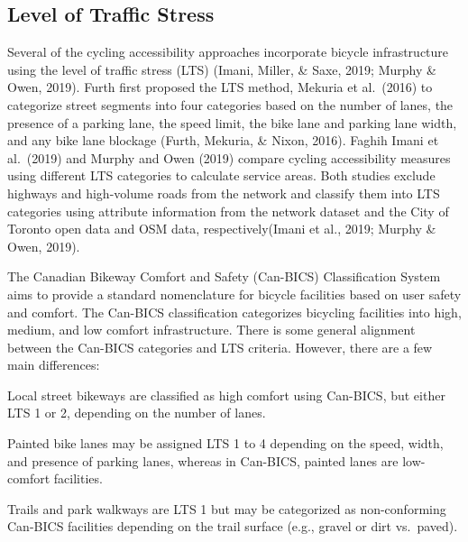 \documentclass[
11pt, %
oneside, %
english, %
singlespacing, %
]{macthesis} %
\begin{document}
\hypertarget{level-of-traffic-stress}{%
\subsection{Level of Traffic Stress}\label{level-of-traffic-stress}}

Several of the cycling accessibility approaches incorporate bicycle infrastructure using the level of traffic stress (LTS) (Imani, Miller, \& Saxe, 2019; Murphy \& Owen, 2019). Furth first proposed the LTS method, Mekuria et al.~(2016) to categorize street segments into four categories based on the number of lanes, the presence of a parking lane, the speed limit, the bike lane and parking lane width, and any bike lane blockage (Furth, Mekuria, \& Nixon, 2016). Faghih Imani et al.~(2019) and Murphy and Owen (2019) compare cycling accessibility measures using different LTS categories to calculate service areas. Both studies exclude highways and high-volume roads from the network and classify them into LTS categories using attribute information from the network dataset and the City of Toronto open data and OSM data, respectively(Imani et al., 2019; Murphy \& Owen, 2019).

The Canadian Bikeway Comfort and Safety (Can-BICS) Classification System aims to provide a standard nomenclature for bicycle facilities based on user safety and comfort. The Can-BICS classification categorizes bicycling facilities into high, medium, and low comfort infrastructure. There is some general alignment between the Can-BICS categories and LTS criteria. However, there are a few main differences:

Local street bikeways are classified as high comfort using Can-BICS, but either LTS 1 or 2, depending on the number of lanes.

Painted bike lanes may be assigned LTS 1 to 4 depending on the speed, width, and presence of parking lanes, whereas in Can-BICS, painted lanes are low-comfort facilities.

Trails and park walkways are LTS 1 but may be categorized as non-conforming Can-BICS facilities depending on the trail surface (e.g., gravel or dirt vs.~paved).

\begingroup\fontsize{12}{14}\selectfont
\end{document}
